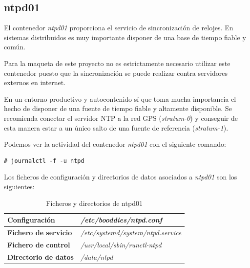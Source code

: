 \documentclass[a4paper,12pt,spanish,final]{epsc_tfc_pfc}
\begin{document}
\subsection{ntpd01}

El contenedor \emph{ntpd01} proporciona el servicio de sincronización de relojes. En sistemas distribuidos es muy importante disponer de una base de tiempo fiable y común.

Para la maqueta de este proyecto no es estrictamente necesario utilizar este contenedor puesto que la sincronización se puede realizar contra servidores externos en internet.

En un entorno productivo y autocontenido sí que toma mucha importancia el hecho de disponer de una fuente de tiempo fiable y altamente disponible. Se recomienda conectar el servidor NTP a la red GPS (\emph{stratum-0}) y conseguir de esta manera estar a un único salto de una fuente de referencia (\emph{stratum-1}).

Podemos ver la actividad del contenedor \emph{ntpd01} con el siguiente comando:\\

\begin{lstlisting}[style=dnsmasq]
# journalctl -f -u ntpd
\end{lstlisting}

Los ficheros de configuración y directorios de datos asociados a \emph{ntpd01} son los siguientes:

\begin{table}[h]

  \centering

  \begin{tabular}{ll}
    \toprule
    \textbf{Configuración}        & \textit{/etc/booddies/ntpd.conf}          \\
    \midrule
    \rowcolor[HTML]{EFEFEF}
    \textbf{Fichero de servicio}  & \textit{/etc/systemd/system/ntpd.service} \\
    \midrule
    \textbf{Fichero de control}   & \textit{/usr/local/sbin/runctl-ntpd}      \\
    \midrule
    \rowcolor[HTML]{EFEFEF}
    \textbf{Directorio de datos}  & \textit{/data/ntpd}                       \\
    \bottomrule
  \end{tabular}

  \caption{Ficheros y directorios de ntpd01}

\end{table}
\end{document}
